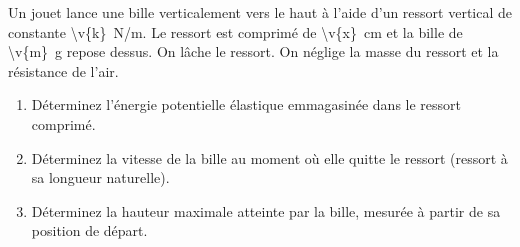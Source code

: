 Un jouet lance une bille verticalement vers le haut à l'aide d'un ressort vertical de constante \qty{\v{k}}{N/m}. Le ressort est comprimé de \qty{\v{x}}{cm} et la bille de \qty{\v{m}}{g} repose dessus. On lâche le ressort. On néglige la masse du ressort et la résistance de l'air.

\begin{enumerate}[label=\alph*)]
    \item Déterminez l'énergie potentielle élastique emmagasinée dans le ressort comprimé.
    \item Déterminez la vitesse de la bille au moment où elle quitte le ressort (ressort à sa longueur naturelle).
    \item Déterminez la hauteur maximale atteinte par la bille, mesurée à partir de sa position de départ.
\end{enumerate}

